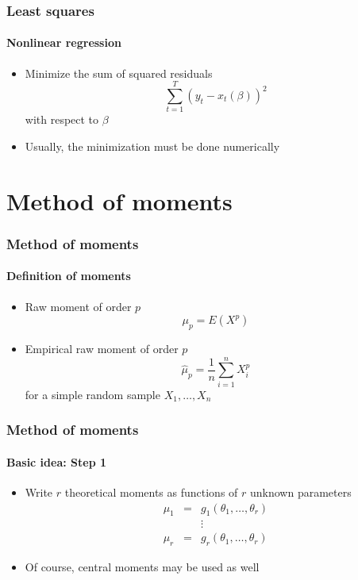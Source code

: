 \documentclass[notes=show]{beamer}
\begin{document}
\begin{frame}\frametitle{Least squares}\framesubtitle{Nonlinear regression}
\begin{itemize}
    \item Minimize the sum of squared residuals%
    \begin{equation*}
        \sum_{t=1}^{T}\left( y_{t}-x_{t}\left( \beta \right) \right) ^{2}
    \end{equation*}%
    with respect to $\beta $
    \item Usually, the minimization must be done numerically
\end{itemize}
\end{frame}


\section{Method of moments}

\begin{frame}\frametitle{Method of moments}\framesubtitle{Definition of moments}
\begin{itemize}
    \item Raw moment of order $p$
    \begin{equation*}
        \mu _{p}=E(X^{p})
    \end{equation*}
    \item Empirical raw moment of order $p$
    \begin{equation*}
        \hat{\mu}_{p}=\frac{1}{n}\sum_{i=1}^{n}X_{i}^{p}
    \end{equation*}%
    for a simple random sample $X_{1},\ldots ,X_{n}$
\end{itemize}
\end{frame}


\begin{frame}\frametitle{Method of moments}\framesubtitle{Basic idea: Step 1}
\begin{itemize}
    \item Write $r$ theoretical moments as functions of $r$ unknown parameters%
    \begin{eqnarray*}
        \mu _{1} &=&g_{1}\left( \theta _{1},\ldots ,\theta _{r}\right) \\
        &&\vdots \\
        \mu _{r} &=&g_{r}\left( \theta _{1},\ldots ,\theta _{r}\right)
    \end{eqnarray*}
    \item Of course, central moments may be used as well
\end{itemize}
\end{frame}
\end{document}
